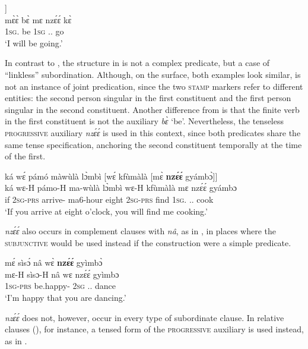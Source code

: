 \ea\label{nzee2}
  \glll  [mɛ̀ɛ̀ bɛ̀ [mɛ̀ {\bfseries nzɛ́ɛ́} kɛ̀]] \\
         {\db}mɛ̀ɛ̀ bɛ̀ {\db}mɛ nzɛ́ɛ́ kɛ̀ \\
            {\db}1\textsc{sg}.{\FUT} be {\db}1\textsc{sg} {\PROG}.{\SUB}.{\R} go\\
    \trans `I will be going.'
\z

In contrast to , the structure in  is not a complex predicate, but a case of ``linkless'' subordination. Although, on the surface, both examples look similar,  is not an instance of joint predication, since the two \textsc{stamp} markers refer to different entities: the second person singular in the first  constituent and the first person singular in the second constituent. Another difference from  is that the finite verb in the first constituent is not the auxiliary {\itshape bɛ̀} `be'. Nevertheless, the tenseless \textsc{progressive} auxiliary {\itshape nzɛ́ɛ́} is used in this context, since both predicates share the same tense specification, anchoring the second constituent temporally at the time of the first.

\ea\label{nzee}
  \glll  ká wɛ́ pámó màwùlà lɔ̀mbì [wɛ́ kfùmàlà [mɛ̀ {\bfseries nzɛ́ɛ́} gyámbɔ̀]] \\
         ká wɛ-H pámo-H ma-wùlà lɔ̀mbì {\db}wɛ-H kfùmàlà {\db}mɛ nzɛ́ɛ́ gyámbɔ \\
           if 2\textsc{sg}-\textsc{prs} arrive-{\R} ma6-hour eight {\db}2\textsc{sg}-\textsc{prs} find {\db}1\textsc{sg}.{\SBJ} {\PROG}.{\SUB}.{\R} cook\\
    \trans `If you arrive at eight o'clock, you will find me cooking.'
\z

{\itshape nzɛ́ɛ́} also occurs in complement clauses with {\itshape nâ}, as in , in places where the \textsc{subjunctive} would be used instead if the construction were a simple predicate.

\ea\label{nzee3}
  \glll  mɛ́ sìsɔ́ nâ wɛ̀ {\bfseries nzɛ́ɛ́} gyìmbɔ̀ \\
         mɛ-H sìsɔ-H nâ wɛ nzɛ́ɛ́ gyìmbɔ \\
         1\textsc{sg}-\textsc{prs} be.happy-{\R} {\COMP} 2\textsc{sg} {\PROG}.{\SUB}.{\R} dance\\
    \trans `I'm happy that you are dancing.'
\z

{\itshape nzɛ́ɛ́} does not, however, occur in every type of subordinate clause. In relative clauses (), for instance, a tensed form of the \textsc{progressive} auxiliary is used instead, as in .

